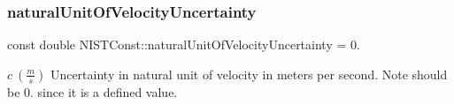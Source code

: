 \subsubsection{\texorpdfstring{natural\+Unit\+Of\+Velocity\+Uncertainty}{naturalUnitOfVelocityUncertainty}}
{\footnotesize\ttfamily const double N\+I\+S\+T\+Const\+::natural\+Unit\+Of\+Velocity\+Uncertainty = 0.}

$c \ (\frac{m}{s})$ Uncertainty in natural unit of velocity in meters per second. Note should be 0. since it is a defined value. 